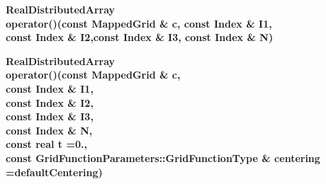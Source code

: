 \begin{flushleft} \textbf{%
RealDistributedArray  \\ 
\settowidth{\OGFunctionIncludeArgIndent}{operator()(}%
operator()(const MappedGrid \& c, const Index \& I1,\\ 
\hspace{\OGFunctionIncludeArgIndent}const Index \& I2,const Index \& I3, const Index \& N)
}\end{flushleft}

 
\begin{flushleft} \textbf{%
RealDistributedArray  \\ 
\settowidth{\OGFunctionIncludeArgIndent}{operator()(}%
operator()(const MappedGrid \& c,\\ 
\hspace{\OGFunctionIncludeArgIndent}const Index \& I1,\\ 
\hspace{\OGFunctionIncludeArgIndent}const Index \& I2,\\ 
\hspace{\OGFunctionIncludeArgIndent}const Index \& I3, \\ 
\hspace{\OGFunctionIncludeArgIndent}const Index \& N, \\ 
\hspace{\OGFunctionIncludeArgIndent}const real t  =0.,\\ 
\hspace{\OGFunctionIncludeArgIndent}const GridFunctionParameters::GridFunctionType \& centering \\ 
\hspace{\OGFunctionIncludeArgIndent}=defaultCentering)
}\end{flushleft}

